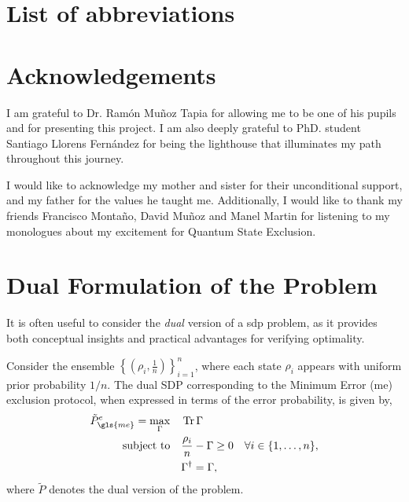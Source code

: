 \documentclass[12pt,letterpaper]{article}
\DeclareMathOperator{\tr}{Tr}
\begin{document}
\section*{List of abbreviations}
\renewcommand{\glsnamefont}[1]{\textbf{#1}}
\printnoidxglossary[type=main, title={\vspace{-1cm}}, nonumberlist, nogroupskip, style=super]

\section*{Acknowledgements}

I am grateful to Dr. Ramón Muñoz Tapia for allowing me to be one of his pupils and for presenting this project. I am also deeply grateful to PhD. student Santiago Llorens Fernández for being the lighthouse that illuminates my path throughout this journey.

I would like to acknowledge my mother and sister for their unconditional support, and my father for the values he taught me. Additionally, I would like to thank my friends Francisco Montaño, David Muñoz and Manel Martin for listening to my monologues about my excitement for Quantum State Exclusion.


\newpage
\appendix

\section{Dual Formulation of the Problem}\label{sectionDualFormulationOfTheProblem}

It is often useful to consider the \emph{dual} version of a \gls{sdp} problem, as it provides both conceptual insights and practical advantages for verifying optimality. 

Consider the ensemble $\left\{ \left( \rho_i, \frac{1}{n} \right) \right\}_{i=1}^n$, where each state $\rho_i$ appears with uniform prior probability $1/n$. The dual SDP corresponding to the Minimum Error (\gls{me}) exclusion protocol, when expressed in terms of the error probability, is given by,
\begin{align*}
	\tilde{P}_{\gls{me}}^e = \max_{\Gamma} \quad & \tr{\Gamma} \\
	\text{subject to} \quad & \frac{\rho_i}{n} - \Gamma \geq 0 \quad \forall i \in \{1, \dots, n\}, \\
	& \Gamma^\dagger = \Gamma,
\end{align*}
where $\tilde{P}$ denotes the dual version of the problem.
\end{document}

